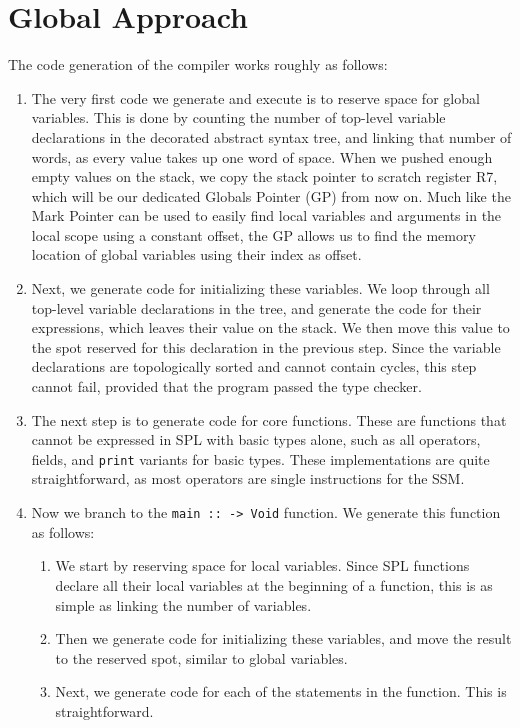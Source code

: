 \section{Global Approach}
The code generation of the compiler works roughly as follows:
\begin{enumerate}
    \item The very first code we generate and execute is to reserve space for global variables. This is done by counting the number of top-level variable declarations in the decorated abstract syntax tree, and linking that number of words, as every value takes up one word of space. When we pushed enough empty values on the stack, we copy the stack pointer to scratch register R7, which will be our dedicated Globals Pointer (GP) from now on. Much like the Mark Pointer can be used to easily find local variables and arguments in the local scope using a constant offset, the GP allows us to find the memory location of global variables using their index as offset.
    \item Next, we generate code for initializing these variables. We loop through all top-level variable declarations in the tree, and generate the code for their expressions, which leaves their value on the stack. We then move this value to the spot reserved for this declaration in the previous step. Since the variable declarations are topologically sorted and cannot contain cycles, this step cannot fail, provided that the program passed the type checker.
    \item The next step is to generate code for core functions. These are functions that cannot be expressed in SPL with basic types alone, such as all operators, fields, and \lstinline|print| variants for basic types. These implementations are quite straightforward, as most operators are single instructions for the SSM.
    \item Now we branch to the \lstinline|main :: -> Void| function. We generate this function as follows:
    \begin{enumerate}
        \item We start by reserving space for local variables. Since SPL functions declare all their local variables at the beginning of a function, this is as simple as linking the number of variables.
        \item Then we generate code for initializing these variables, and move the result to the reserved spot, similar to global variables.
        \item Next, we generate code for each of the statements in the function. This is straightforward.

\end{enumerate}
\end{enumerate}
